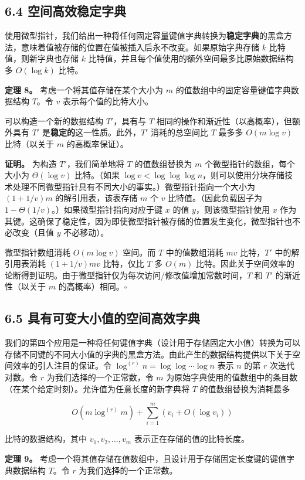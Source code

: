 \documentclass[12pt,a4paper]{ctexart}
\theoremstyle{remark}
\begin{document}
\subsection{6.4 空间高效稳定字典}
使用微型指针，我们给出一种将任何固定容量键值字典转换为\textbf{稳定字典}的黑盒方法，意味着值被存储的位置在值被插入后永不改变。如果原始字典存储 $k$ 比特值，则新字典也存储 $k$ 比特值，并且每个值使用的额外空间最多比原始数据结构多 $O(\log k)$ 比特。

\textbf{定理 8。} 考虑一个将其值存储在某个大小为 $m$ 的值数组中的固定容量键值字典数据结构 $T$。令 $v$ 表示每个值的比特大小。

可以构造一个新的数据结构 $T'$，具有与 $T$ 相同的操作和渐近性（以高概率），但额外具有 $T'$ 是\textbf{稳定的}这一性质。此外，$T'$ 消耗的总空间比 $T$ 最多多 $O(m\log v)$ 比特（以关于 $m$ 的高概率保证）。

\textbf{证明。} 为构造 $T'$，我们简单地将 $T$ 的值数组替换为 $m$ 个微型指针的数组，每个大小为 $\Theta(\log v)$ 比特。（如果 $\log v<\log\log\log n$，则可以使用分块存储技术处理不同微型指针具有不同大小的事实。）微型指针指向一个大小为 $(1+1/v)m$ 的解引用表，该表存储 $m$ 个 $v$ 比特值。（因此负载因子为 $1-\Theta(1/v)$。）如果微型指针指向对应于键 $x$ 的值 $y$，则该微型指针使用 $x$ 作为其键。这确保了稳定性，因为即使微型指针被存储的位置发生变化，微型指针也不必改变（且值 $y$ 不必移动）。

微型指针数组消耗 $O(m\log v)$ 空间。而 $T$ 中的值数组消耗 $mv$ 比特，$T'$ 中的解引用表消耗 $(1+1/v)mv$ 比特，仅比 $T$ 多 $O(m)$ 比特。因此关于空间效率的论断得到证明。由于微型指针仅为每次访问/修改值增加常数时间，$T$ 和 $T'$ 的渐近性（以关于 $m$ 的高概率）相同。$\square$

\subsection{6.5 具有可变大小值的空间高效字典}
我们的第四个应用是一种将任何键值字典（设计用于存储固定大小值）转换为可以存储不同键的不同大小值的字典的黑盒方法。由此产生的数据结构提供以下关于空间效率的引人注目的保证。令 $\log^{(r)}n=\log\log\cdots\log n$ 表示 $n$ 的第 $r$ 次迭代对数。令 $r$ 为我们选择的一个正常数，令 $m$ 为原始字典使用的值数组中的条目数（在某个给定时刻）。允许值为任意长度的新字典将 $T$ 的值数组替换为消耗最多

$$O(m\log^{(r)}m)+\sum_{i=1}^{m}(v_i+O(\log v_i))$$

比特的数据结构，其中 $v_1,v_2,\ldots,v_m$ 表示正在存储的值的比特长度。

\textbf{定理 9。} 考虑一个将其值存储在值数组中，且设计用于存储固定长度键的键值字典数据结构 $T$。令 $r$ 为我们选择的一个正常数。
\end{document}
